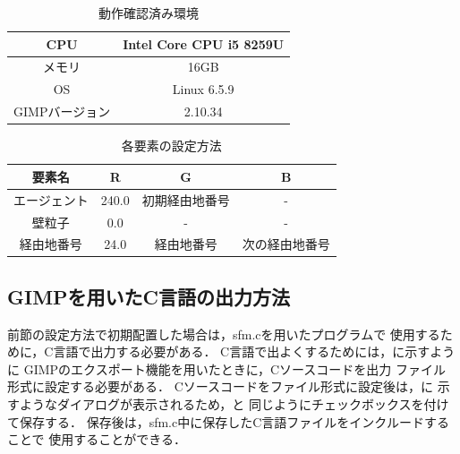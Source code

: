 \begin{table}[t]
  \begin{center}
    \caption{動作確認済み環境}
    \label{tb:conform_env}
    \begin{tabular}{c|c}
      \hline \hline
      CPU              & Intel Core CPU i5 8259U    \\ \hline
      メモリ            & 16GB                       \\ \hline
      OS               & Linux 6.5.9                 \\ \hline
      GIMPバージョン    & 2.10.34 \\ \hline
    \end{tabular}
  \end{center}
\end{table}

\begin{table}[t]
  \begin{center}
    \caption{各要素の設定方法}
    \label{tb:rgb_settings}
    \begin{tabular}{c|c|c|c}
      \hline \hline
      要素名        & R     & G & B \\ \hline
      エージェント   & 240.0 & 初期経由地番号 & - \\ \hline
      壁粒子         & 0.0    & - & -\\ \hline
      経由地番号      & 24.0  & 経由地番号 & 次の経由地番号 \\ \hline
    \end{tabular}
  \end{center}
\end{table}

\subsection{GIMPを用いたC言語の出力方法}
前節の設定方法で初期配置した場合は，sfm.cを用いたプログラムで
使用するために，C言語で出力する必要がある．
C言語で出よくするためには，に示すように
GIMPのエクスポート機能を用いたときに，Cソースコードを出力
ファイル形式に設定する必要がある．
Cソースコードをファイル形式に設定後は，に
示すようなダイアログが表示されるため，と
同じようにチェックボックスを付けて保存する．
保存後は，sfm.c中に保存したC言語ファイルをインクルードすることで
使用することができる．

